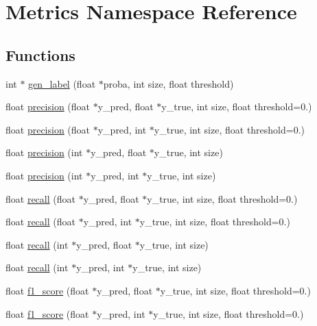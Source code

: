 \hypertarget{namespace_metrics}{\section{Metrics Namespace Reference}
\label{namespace_metrics}
}
\subsection*{Functions}
\begin{DoxyCompactItemize}
\item 
int $\ast$ \hyperlink{namespace_metrics_ac6e684b943095156e072649cb421452a}{gen\+\_\+label} (float $\ast$proba, int size, float threshold)
\item 
float \hyperlink{namespace_metrics_af522960cbeb7b7dd0ac10c8a88d1be77}{precision} (float $\ast$y\+\_\+pred, float $\ast$y\+\_\+true, int size, float threshold=0.)
\item 
float \hyperlink{namespace_metrics_ac1a4db1d7c8e16295686c09cb535fbe4}{precision} (float $\ast$y\+\_\+pred, int $\ast$y\+\_\+true, int size, float threshold=0.)
\item 
float \hyperlink{namespace_metrics_aa2bcf1af5d12ef0ced8777383218306d}{precision} (int $\ast$y\+\_\+pred, float $\ast$y\+\_\+true, int size)
\item 
float \hyperlink{namespace_metrics_a3025e6e67479b9b4786996ca36c670fb}{precision} (int $\ast$y\+\_\+pred, int $\ast$y\+\_\+true, int size)
\item 
float \hyperlink{namespace_metrics_ae4ec18391e6582483ffe1a00f7407135}{recall} (float $\ast$y\+\_\+pred, float $\ast$y\+\_\+true, int size, float threshold=0.)
\item 
float \hyperlink{namespace_metrics_a77fd2905d5de2451d27838a2c4a7c368}{recall} (float $\ast$y\+\_\+pred, int $\ast$y\+\_\+true, int size, float threshold=0.)
\item 
float \hyperlink{namespace_metrics_a5275b85f6ff8498a9682d863cc711859}{recall} (int $\ast$y\+\_\+pred, float $\ast$y\+\_\+true, int size)
\item 
float \hyperlink{namespace_metrics_a6e422b5f59fcead5d60b9bdad69f84d9}{recall} (int $\ast$y\+\_\+pred, int $\ast$y\+\_\+true, int size)
\item 
float \hyperlink{namespace_metrics_afe6817752e96a79f98a7ba4d9dacbf1b}{f1\+\_\+score} (float $\ast$y\+\_\+pred, float $\ast$y\+\_\+true, int size, float threshold=0.)
\item 
float \hyperlink{namespace_metrics_ae6868a2cd1dceed83d6b50854cd8a19b}{f1\+\_\+score} (float $\ast$y\+\_\+pred, int $\ast$y\+\_\+true, int size, float threshold=0.)

\end{DoxyCompactItemize}
